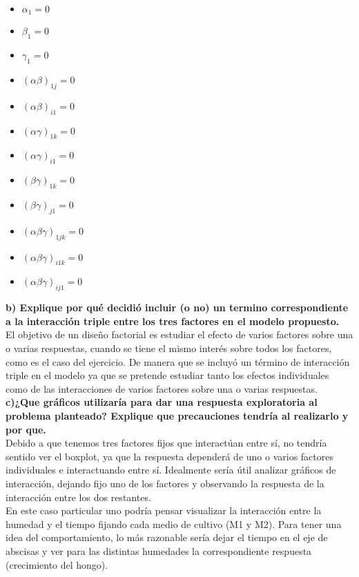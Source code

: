 \documentclass[11pt]{article}
\providecommand{\tightlist}{%
      \setlength{\itemsep}{0pt}\setlength{\parskip}{0pt}}
\begin{document}
\begin{itemize}
\tightlist
\item
  \(\alpha_1 = 0\)
\item
  \(\beta_1 = 0\)
\item
  \(\gamma_1 = 0\)
\item
  \((\alpha \beta)_{1j} = 0\)
\item
  \((\alpha \beta)_{i1} = 0\)
\item
  \((\alpha \gamma)_{1k} = 0\)
\item
  \((\alpha \gamma)_{i1} = 0\)
\item
  \((\beta \gamma)_{1k} = 0\)
\item
  \((\beta \gamma)_{j1} = 0\)
\item
  \((\alpha \beta \gamma)_{1jk} = 0\)
\item
  \((\alpha \beta \gamma)_{i1k} = 0\)
\item
  \((\alpha \beta \gamma)_{ij1} = 0\)
\end{itemize}

    \textbf{b) Explique por qué decidió incluir (o no) un termino
correspondiente a la interacción triple entre los tres factores en el
modelo propuesto.}\\

El objetivo de un diseño factorial es estudiar el efecto de varios factores sobre una o varias respuestas, cuando se tiene el mismo interés sobre todos los factores, como es el caso del ejercicio. De manera que se incluyó un término de interacción triple en el modelo ya que se pretende estudiar tanto los efectos individuales como de las interacciones de varios factores sobre una o varias respuestas.\\

    \textbf{c)¿Que gráficos utilizaría para dar una respuesta exploratoria
al problema planteado? Explique que precauciones tendría al realizarlo y
por que.} \\

Debido a que tenemos tres factores fijos que interactúan entre sí, no
tendría sentido ver el boxplot, ya que la respuesta dependerá de uno o varios factores individuales e interactuando entre sí. Idealmente sería útil analizar gráficos de interacción, dejando fijo uno de los factores y observando la respuesta de la interacción entre los dos restantes. \\

En este caso particular uno podría pensar visualizar la interacción entre la humedad y el tiempo fijando cada medio de cultivo (M1 y M2). Para tener una idea del comportamiento, lo más razonable sería dejar el tiempo en el eje de abscisas y ver para las distintas humedades la correspondiente respuesta (crecimiento del hongo).\\
\end{document}
